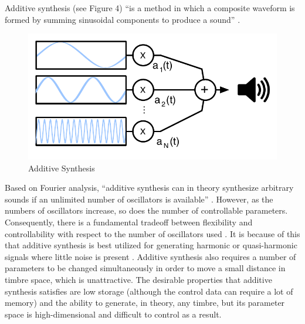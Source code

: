 \documentclass[12pt]{report} 	%
\numberwithin{figure}{chapter}
\numberwithin{table}{chapter}
\numberwithin{equation}{chapter}
\begin{document}
\begin{flushleft}
Additive synthesis (see Figure 4) ``is a method in which a composite waveform is formed by summing sinusoidal components to produce a sound'' \cite[p. 17]{Tolonen:1998bh}. 
\begin{figure}[h!]
\begin{center}
\includegraphics[scale=0.8]{AdditiveSynthesis}
\caption[Additive synthesis]{Additive Synthesis}
\end{center}
\end{figure}
Based on Fourier analysis, ``additive synthesis can in theory synthesize arbitrary sounds if an unlimited number of oscillators is available'' \cite[p. 94]{Tolonen:1998bh}. However, as the numbers of oscillators increase, so does the number of controllable parameters. Consequently, there is a fundamental tradeoff between flexibility and controllability with respect to the number of oscillators used \cite[p. 7]{Klingbeil:2009lo}. It is because of this that additive synthesis is best utilized for generating harmonic or quasi-harmonic signals where little noise is present \cite[p. 5]{Vercoe:1998hh}. Additive synthesis also requires a number of parameters to be changed simultaneously in order to move a small distance in timbre space, which is unattractive. The desirable properties that additive synthesis satisfies are low storage (although the control data can require a lot of memory) and the ability to generate, in theory, any timbre, but its parameter space is high-dimensional and difficult to control as a result.


\end{flushleft}
\end{document}
